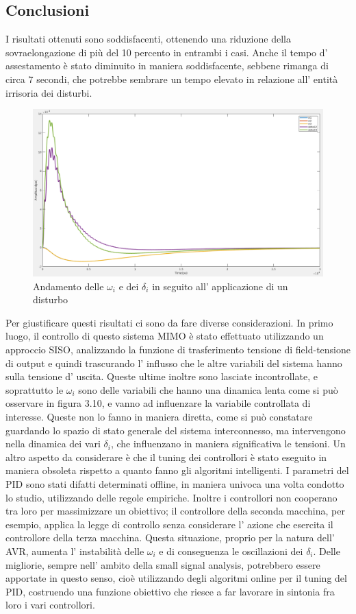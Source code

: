 \documentclass[Lau,noexaminfo]{sapthesis}
\begin{document}
	\subsection{Conclusioni}
	I risultati ottenuti sono soddisfacenti, ottenendo una riduzione della sovraelongazione di più del 10 percento in entrambi i casi. Anche il tempo d' assestamento è stato diminuito in maniera soddisfacente, sebbene rimanga di circa 7 secondi, che potrebbe sembrare un tempo elevato in relazione all' entità irrisoria dei disturbi.
	\begin{figure}[h]
		\centering
		\includegraphics[scale=0.255]{simulazione_oscillazioni_disturbo}
		\caption{Andamento delle $\omega_i$ e dei $\delta_i$ in seguito all' applicazione di un disturbo}
	\end{figure}
	 Per giustificare questi risultati ci sono da fare diverse considerazioni. In primo luogo, il controllo di questo sistema MIMO è stato effettuato utilizzando un approccio SISO, analizzando la funzione di trasferimento tensione di field-tensione di output e quindi trascurando l' influsso che le altre variabili del sistema hanno sulla tensione d' uscita. Queste ultime inoltre sono lasciate incontrollate, e soprattutto le $\omega_i$ sono delle variabili che hanno una dinamica lenta come si può osservare in figura 3.10, e vanno ad influenzare la variabile controllata di interesse. Queste non lo fanno in maniera diretta, come si può constatare guardando lo spazio di stato generale del sistema interconnesso, ma intervengono nella dinamica dei vari $\delta_i$, che influenzano in maniera significativa le tensioni. Un altro aspetto da considerare è che il tuning dei controllori è stato eseguito in maniera obsoleta rispetto a quanto fanno gli algoritmi intelligenti. I parametri del PID sono stati difatti determinati offline, in maniera univoca una volta condotto lo studio, utilizzando delle regole empiriche. Inoltre i controllori non cooperano tra loro per massimizzare un obiettivo; il controllore della seconda macchina, per esempio, applica la legge di controllo senza considerare l' azione che esercita il controllore della terza macchina. Questa situazione, proprio per la natura dell' AVR, aumenta l' instabilità delle $\omega_i$ e di conseguenza le oscillazioni dei $\delta_i$. Delle migliorie, sempre nell' ambito della small signal analysis, potrebbero essere apportate in questo senso, cioè utilizzando degli algoritmi online per il tuning del PID, costruendo una funzione obiettivo che riesce a far lavorare in sintonia fra loro i vari controllori.
	\appendix
\end{document}
